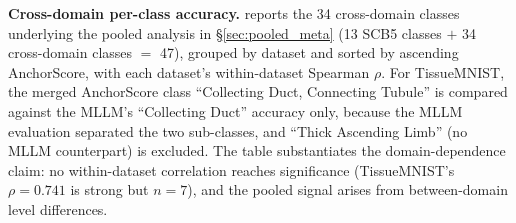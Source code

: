 \documentclass[11pt,a4paper]{article}
\begin{document}
\textbf{Cross-domain per-class accuracy.}  reports the 34 cross-domain classes underlying the pooled analysis in \S\ref{sec:pooled_meta} (13 SCB5 classes $+$ 34 cross-domain classes $=$ 47), grouped by dataset and sorted by ascending AnchorScore, with each dataset's within-dataset Spearman $\rho$. For TissueMNIST, the merged AnchorScore class ``Collecting Duct, Connecting Tubule'' is compared against the MLLM's ``Collecting Duct'' accuracy only, because the MLLM evaluation separated the two sub-classes, and ``Thick Ascending Limb'' (no MLLM counterpart) is excluded. The table substantiates the domain-dependence claim: no within-dataset correlation reaches significance (TissueMNIST's $\rho=0.741$ is strong but $n=7$), and the pooled signal arises from between-domain level differences.
\end{document}
